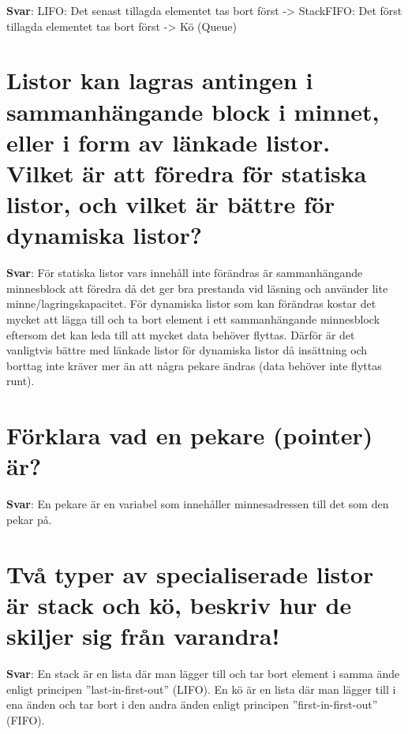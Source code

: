 \documentclass[a4paper,11pt,oneside]{book}
\begin{document}
\begin{sloppypar}
\label{q:261:sa:sv:True}

\textbf{Svar}: LIFO: Det senast tillagda elementet tas bort f\"orst -> StackFIFO: Det f\"orst tillagda elementet tas bort f\"orst -> K\"o (Queue)



\section{Listor kan lagras antingen i sammanh\"angande block i minnet, eller i form av l\"ankade listor. Vilket \"ar att f\"oredra f\"or statiska listor, och vilket \"ar b\"attre f\"or dynamiska listor?}

\label{q:262:sa:sv:True}

\textbf{Svar}: F\"or statiska listor vars inneh\r{a}ll inte f\"or\"andras \"ar sammanh\"angande minnesblock att f\"oredra d\r{a} det ger bra prestanda vid l\"asning och anv\"ander lite minne/lagringskapacitet. F\"or dynamiska listor som kan f\"or\"andras kostar det mycket att l\"agga till och ta bort element i ett sammanh\"angande minnesblock eftersom det kan leda till att mycket data beh\"over flyttas. D\"arf\"or \"ar det vanligtvis b\"attre med l\"ankade listor f\"or dynamiska listor d\r{a} ins\"attning och borttag inte kr\"aver mer \"an att n\r{a}gra pekare \"andras (data beh\"over inte flyttas runt).



\section{F\"orklara vad en pekare (pointer) \"ar?}

\label{q:263:sa:sv:True}

\textbf{Svar}: En pekare \"ar en variabel som inneh\r{a}ller minnesadressen till det som den pekar p\r{a}.



\section{Tv\r{a} typer av specialiserade listor \"ar stack och k\"o, beskriv hur de skiljer sig fr\r{a}n varandra!}

\label{q:264:sa:sv:True}

\textbf{Svar}: En stack \"ar en lista d\"ar man l\"agger till och tar bort element i samma \"ande enligt principen {\textquotedblright}last-in-first-out{\textquotedblright} (LIFO). En k\"o \"ar en lista d\"ar man l\"agger till i ena \"anden och tar bort i den andra \"anden enligt principen {\textquotedblright}first-in-first-out{\textquotedblright} (FIFO).




\end{sloppypar}
\end{document}
